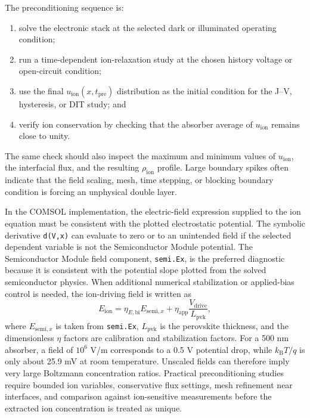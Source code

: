 The preconditioning sequence is:
\begin{enumerate}
\item solve the electronic stack at the selected dark or illuminated operating
condition;
\item run a time-dependent ion-relaxation study at the chosen history voltage
or open-circuit condition;
\item use the final $u_{\mathrm{ion}}(x,t_{\mathrm{pre}})$ distribution as the
initial condition for the J--V, hysteresis, or DIT study; and
\item verify ion conservation by checking that the absorber average of
$u_{\mathrm{ion}}$ remains close to unity.
\end{enumerate}
The same check should also inspect the maximum and minimum values of
$u_{\mathrm{ion}}$, the interfacial flux, and the resulting
$\rho_{\mathrm{ion}}$ profile. Large boundary spikes often indicate that the
field scaling, mesh, time stepping, or blocking boundary condition is forcing
an unphysical double layer.

In the COMSOL implementation, the electric-field expression supplied to the
ion equation must be consistent with the plotted electrostatic potential. The
symbolic derivative \texttt{d(V,x)} can evaluate to zero or to an unintended
field if the selected dependent variable is not the Semiconductor Module
potential. The Semiconductor Module field component, \texttt{semi.Ex}, is the
preferred diagnostic because it is consistent with the potential slope plotted
from the solved semiconductor physics. When additional numerical stabilization
or applied-bias control is needed, the ion-driving field is written as
\begin{equation}
E_{\mathrm{ion}}
=\eta_{E,\mathrm{bi}}E_{\mathrm{semi},x}
+\eta_{\mathrm{app}}\frac{V_{\mathrm{drive}}}{L_{\mathrm{pvk}}},
\end{equation}
where $E_{\mathrm{semi},x}$ is taken from \texttt{semi.Ex},
$L_{\mathrm{pvk}}$ is the perovskite thickness, and the dimensionless
$\eta$ factors are calibration and stabilization factors. For a 500 nm
absorber, a field of $10^6$ V/m corresponds to a 0.5 V potential drop, while
$k_{\mathrm{B}}T/q$ is only about 25.9 mV at room temperature. Unscaled fields
can therefore imply very large Boltzmann concentration ratios. Practical
preconditioning studies require bounded ion variables, conservative flux
settings, mesh refinement near interfaces, and comparison against
ion-sensitive measurements before the extracted ion concentration is treated
as unique.

